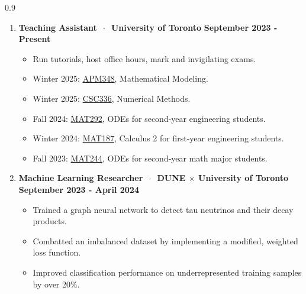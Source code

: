 \documentclass{article}
\begin{document}
\begin{spacing}{0.9}
\begin{enumerate}[itemsep=0.1em, parsep=0.1em, topsep=0.1em]
    \item \textbf{Teaching Assistant} $ \ \cdot \ $ \small{\textbf{University of Toronto}} \hspace{\fill} \textbf{September 2023 - Present}\\
    \normalsize 

    \small{ 
        \begin{itemize}[itemsep=0.1pt,parsep=0.1pt, topsep=0.1pt]
            \item Run tutorials, host office hours, mark and invigilating exams.
            \item Winter 2025: \href{https://artsci.calendar.utoronto.ca/course/apm348h1}{\color{blue}APM348}, Mathematical Modeling.
            \item Winter 2025: \href{https://artsci.calendar.utoronto.ca/course/csc336h1}{\color{blue}CSC336}, Numerical Methods. 
            \item Fall 2024: \href{https://engineering.calendar.utoronto.ca/course/mat292h1}{\color{blue}MAT292}, ODEs for second-year engineering students.
            \item Winter 2024: \href{https://engineering.calendar.utoronto.ca/course/mat187h1}{\color{blue}MAT187}, Calculus 2 for first-year engineering students.
            \item Fall 2023: \href{https://artsci.calendar.utoronto.ca/course/mat244h1}{\color{blue}MAT244}, ODEs for second-year math major students. 
        \end{itemize}
    }

    \normalsize


    \item \textbf{Machine Learning Researcher} $ \ \cdot \ $ \small{\textbf{DUNE $\times$ University of Toronto}} \hspace{\fill} \textbf{September 2023 - April 2024}\\
    \normalsize 

    \small{ 
        \begin{itemize}[itemsep=0.1pt,parsep=0.1pt, topsep=0.1pt]
            \item Trained a graph neural network to detect tau neutrinos and their decay products.
            \item Combatted an imbalanced dataset by implementing a modified, weighted loss function.
            \item Improved classification performance on underrepresented training samples by over 20\%.
        \end{itemize}
    }
    \normalsize




\end{enumerate}
\end{spacing}
\end{document}
